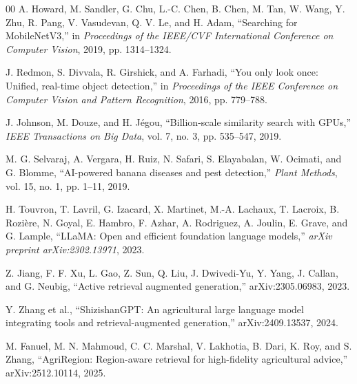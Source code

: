 \documentclass[conference]{IEEEtran}
\begin{document}
\begin{thebibliography}{00}
A. Howard, M. Sandler, G. Chu, L.-C. Chen, B. Chen, M. Tan, W. Wang, Y. Zhu, R. Pang, V. Vasudevan, Q. V. Le, and H. Adam, ``Searching for MobileNetV3,'' in \textit{Proceedings of the IEEE/CVF International Conference on Computer Vision}, 2019, pp. 1314--1324.

J. Redmon, S. Divvala, R. Girshick, and A. Farhadi, ``You only look once: Unified, real-time object detection,'' in \textit{Proceedings of the IEEE Conference on Computer Vision and Pattern Recognition}, 2016, pp. 779--788.

J. Johnson, M. Douze, and H. J\'{e}gou, ``Billion-scale similarity search with GPUs,'' \textit{IEEE Transactions on Big Data}, vol. 7, no. 3, pp. 535--547, 2019.

M. G. Selvaraj, A. Vergara, H. Ruiz, N. Safari, S. Elayabalan, W. Ocimati, and G. Blomme, ``AI-powered banana diseases and pest detection,'' \textit{Plant Methods}, vol. 15, no. 1, pp. 1--11, 2019.

H. Touvron, T. Lavril, G. Izacard, X. Martinet, M.-A. Lachaux, T. Lacroix, B. Rozi\`{e}re, N. Goyal, E. Hambro, F. Azhar, A. Rodriguez, A. Joulin, E. Grave, and G. Lample, ``LLaMA: Open and efficient foundation language models,'' \textit{arXiv preprint arXiv:2302.13971}, 2023.


Z. Jiang, F. F. Xu, L. Gao, Z. Sun, Q. Liu, J. Dwivedi-Yu, Y. Yang, J. Callan, and G. Neubig, ``Active retrieval augmented generation,'' arXiv:2305.06983, 2023.

Y. Zhang et al., ``ShizishanGPT: An agricultural large language model integrating tools and retrieval-augmented generation,'' arXiv:2409.13537, 2024.

M. Fanuel, M. N. Mahmoud, C. C. Marshal, V. Lakhotia, B. Dari, K. Roy, and S. Zhang, ``AgriRegion: Region-aware retrieval for high-fidelity agricultural advice,'' arXiv:2512.10114, 2025.

\end{thebibliography}
\end{document}
